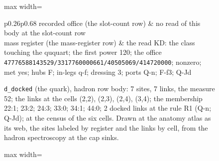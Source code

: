 \begin{chconditional}
\begin{figure}[H]
\caption{\texttt{d\_docked} (the quark), hadron row body: 7 sites, 7 links, the measure 52; the links at the cells (2,2), (2,3), (2,4), (3,4); the membership 22:1; 23:2; 24:3; 33:0; 34:1; 44:0; 2 docked links at the rule R1 (Q-n; Q-Jd); at the census of the six cells. Drawn at the anatomy atlas as its web, the sites labeled by register and the links by cell, from the hadron spectroscopy at the cap sinks.}\label{fig:VII-6-D540002-d-docked-984193}
\begin{center}\footnotesize\begin{adjustbox}{max width=\linewidth}\begin{tabular}{p{0.26\textwidth}p{0.68\textwidth}}\toprule
recorded office (the slot-count row) & no read of this body at the slot-count row \\
mass register (the mass-register row) & the read KD: the class touching the ququart; the first power 120; the office \texttt{47776588143529/3317760000\textbar{}661/4050\textbar{}5069/41472000\textbar{}0}; nonzero; met yes; hubs F; in-legs q-f; dressing 3; ports Q-n; F-f3; Q-Jd \\
\bottomrule\end{tabular}\end{adjustbox}\end{center}
\end{figure}
\begin{figure}[H]\centering
\begin{adjustbox}{max width=\linewidth}
\end{adjustbox}
\end{figure}
\end{chconditional}
